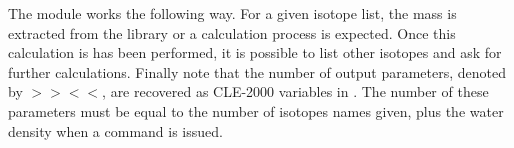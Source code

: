 The  module works the following way. For a given isotope list, the mass is
extracted from the library or a calculation process is expected. Once this
calculation is has been performed, it is possible to list other isotopes and ask for
further calculations. Finally note that the number of output parameters, denoted by
$>>$$<<$, are recovered as CLE-2000 variables in . The number
of these parameters must be equal to the number of isotopes
names given, plus the water density when a command   
is issued.

\eject
